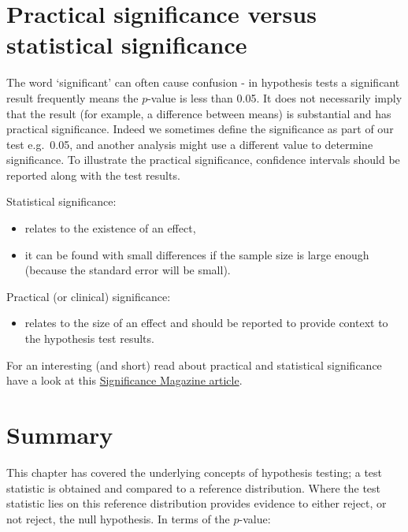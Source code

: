 \documentclass[
  oneside]{krantz}
\providecommand{\tightlist}{%
  \setlength{\itemsep}{0pt}\setlength{\parskip}{0pt}}
\begin{document}
\hypertarget{practical-significance-versus-statistical-significance}{%
\section{Practical significance versus statistical significance}\label{practical-significance-versus-statistical-significance}}

The word `significant' can often cause confusion - in hypothesis tests a significant result frequently means the \(p\)-value is less than 0.05. It does not necessarily imply that the result (for example, a difference between means) is substantial and has practical significance. Indeed we sometimes define the significance as part of our test e.g.~0.05, and another analysis might use a different value to determine significance. To illustrate the practical significance, confidence intervals should be reported along with the test results.

Statistical significance:

\begin{itemize}
\item
  relates to the existence of an effect,
\item
  it can be found with small differences if the sample size is large enough (because the standard error will be small).
\end{itemize}

Practical (or clinical) significance:

\begin{itemize}
\tightlist
\item
  relates to the size of an effect and should be reported to provide context to the hypothesis test results.
\end{itemize}

For an interesting (and short) read about practical and statistical significance have a look at this \href{https://www.significancemagazine.com/14-the-statistics-dictionary/112-the-statistics-dictionary-significantly-misleading}{Significance Magazine article}.

\hypertarget{SUMhyp}{%
\section{Summary}\label{SUMhyp}}

This chapter has covered the underlying concepts of hypothesis testing; a test statistic is obtained and compared to a reference distribution. Where the test statistic lies on this reference distribution provides evidence to either reject, or not reject, the null hypothesis. In terms of the \(p\)-value:
\end{document}
